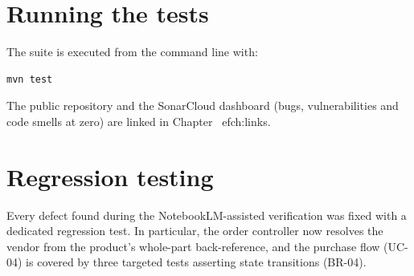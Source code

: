\section{Running the tests}

The suite is executed from the command line with:

\begin{lstlisting}
mvn test
\end{lstlisting}

The public repository and the SonarCloud dashboard (bugs, vulnerabilities
and code smells at zero) are linked in Chapter~
ef{ch:links}.

\section{Regression testing}

Every defect found during the NotebookLM-assisted verification was fixed with
a dedicated regression test. In particular, the order controller now resolves
the vendor from the product's whole-part back-reference, and the purchase flow
(UC-04) is covered by three targeted tests asserting state transitions
(BR-04).
